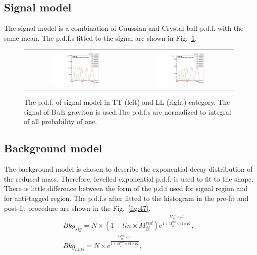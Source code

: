 \begin{itemize}
\subsection{Signal model}
The signal model is a combination of Gaussian and Crystal ball p.d.f. with the same mean. The p.d.f.s fitted to the signal are shown in Fig.~\ref{fig:46}.  
\begin{figure}[t]
  \centering
 \begin{tabular}{cc}
    \includegraphics[width=0.5\textwidth]{Figures/sigMod/TT.pdf} &
   \includegraphics[width=0.5\textwidth]{Figures/sigMod/LL.pdf} \\
  \end{tabular}
  \caption{The p.d.f. of signal model in TT (left) and LL (right) category. The signal of Bulk graviton is used.The p.d.f.s are normalized to integral of all probability of one.}
  \label{fig:46}
\end{figure}

\subsection{Background model}
The background model is chosen to describe the exponential-decay distribution of the reduced mass. Therefore, levelled exponential p.d.f. is used to fit to the shape. There is little difference between the form of the p.d.f used for signal region and for anti-tagged region. The p.d.f.s after fitted to the histogram in the pre-fit and post-fit procedure are shown in the Fig.~\ref{fig:47}. %
\begin{equation} 
\begin{split}
Bkg_{sig} = N \times (1 + lin \times M^{red}_{jj})e^{\frac{M^{red}_{jj}\times p1}{1+M^{red}_{jj} \times p1 \times p2}}, \\
Bkg_{anti} = N \times e^{\frac{M^{red}_{jj}\times p1}{1+M^{red}_{jj} \times p1 \times p2}},
\end{split} 
\end{equation}




\end{itemize}
